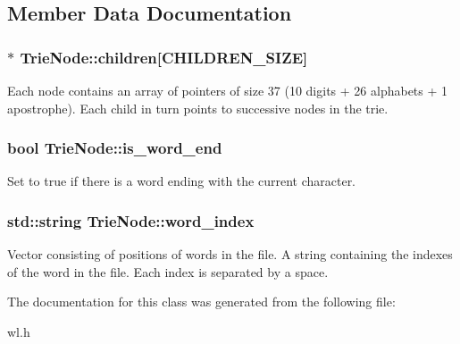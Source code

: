 \subsection{Member Data Documentation}
\hypertarget{classTrieNode_a69ae75c32241f3f6b49f3aad6e6fb6f2}{
\subsubsection[{children}]{$\ast$ Trie\-Node\-::children\mbox{[}C\-H\-I\-L\-D\-R\-E\-N\-\_\-\-S\-I\-Z\-E\mbox{]}}}\label{classTrieNode_a69ae75c32241f3f6b49f3aad6e6fb6f2}
Each node contains an array of pointers of size 37 (10 digits + 26 alphabets + 1 apostrophe). Each child in turn points to successive nodes in the trie. \hypertarget{classTrieNode_a14983627e54ef24a0963d2836755dcaf}{
\subsubsection[{is\-\_\-word\-\_\-end}]{\setlength{\rightskip}{0pt plus 5cm}bool Trie\-Node\-::is\-\_\-word\-\_\-end}}\label{classTrieNode_a14983627e54ef24a0963d2836755dcaf}
Set to true if there is a word ending with the current character. \hypertarget{classTrieNode_a47dd439e1e4db41bb42fa8d3c696cdae}{
\subsubsection[{word\-\_\-index}]{\setlength{\rightskip}{0pt plus 5cm}std\-::string Trie\-Node\-::word\-\_\-index}}\label{classTrieNode_a47dd439e1e4db41bb42fa8d3c696cdae}
Vector consisting of positions of words in the file. A string containing the indexes of the word in the file. Each index is separated by a space. 

The documentation for this class was generated from the following file\-:\begin{DoxyCompactItemize}
\item 
wl.\-h\end{DoxyCompactItemize}

